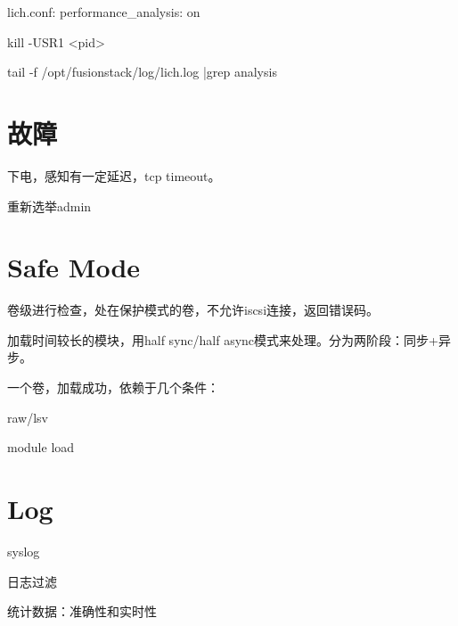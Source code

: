 lich.conf: performance\_analysis: on

kill -USR1 <pid>

tail -f /opt/fusionstack/log/lich.log |grep analysis

\section{故障}

下电，感知有一定延迟，tcp timeout。

重新选举admin

\section{Safe Mode}

卷级进行检查，处在保护模式的卷，不允许iscsi连接，返回错误码。

加载时间较长的模块，用half sync/half async模式来处理。分为两阶段：同步+异步。

一个卷，加载成功，依赖于几个条件：
\begin{compactitem}
    \item raw/lsv
    \item module load
\end{compactitem}

\section{Log}

syslog

日志过滤

统计数据：准确性和实时性
